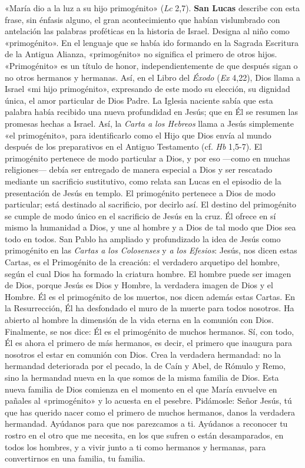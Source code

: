 \documentclass[]{article}
\begin{document}
«María dio a la luz a su hijo primogénito» (\emph{Lc} 2,7). \textbf{San
Lucas} describe con esta frase, sin énfasis alguno, el gran
acontecimiento que habían vislumbrado con antelación las palabras
proféticas en la historia de Israel. Designa al niño como «primogénito».
En el lenguaje que se había ido formando en la Sagrada Escritura de la
Antigua Alianza, «primogénito» no significa el primero de otros hijos.
«Primogénito» es un título de honor, independientemente de que después
sigan o no otros hermanos y hermanas. Así, en el Libro del \emph{Éxodo}
(\emph{Ex} 4,22), Dios llama a Israel «mi hijo primogénito», expresando
de este modo su elección, su dignidad única, el amor particular de Dios
Padre. La Iglesia naciente sabía que esta palabra había recibido una
nueva profundidad en Jesús; que en Él se resumen las promesas hechas a
Israel. Así, la \emph{Carta a los Hebreos} llama a Jesús simplemente «el
primogénito», para identificarlo como el Hijo que Dios envía al mundo
después de los preparativos en el Antiguo Testamento (cf. \emph{Hb}
1,5-7). El primogénito pertenece de modo particular a Dios, y por eso
---como en muchas religiones--- debía ser entregado de manera especial a
Dios y ser rescatado mediante un sacrificio sustitutivo, como relata san
Lucas en el episodio de la presentación de Jesús en templo. El
primogénito pertenece a Dios de modo particular; está destinado al
sacrificio, por decirlo así. El destino del primogénito se cumple de
modo único en el sacrificio de Jesús en la cruz. Él ofrece en sí mismo
la humanidad a Dios, y une al hombre y a Dios de tal modo que Dios sea
todo en todos. San Pablo ha ampliado y profundizado la idea de Jesús
como primogénito en las \emph{Cartas a los Colosenses} y \emph{a los
Efesios}: Jesús, nos dicen estas Cartas, es el Primogénito de la
creación: el verdadero arquetipo del hombre, según el cual Dios ha
formado la criatura hombre. El hombre puede ser imagen de Dios, porque
Jesús es Dios y Hombre, la verdadera imagen de Dios y el Hombre. Él es
el primogénito de los muertos, nos dicen además estas Cartas. En la
Resurrección, Él ha desfondado el muro de la muerte para todos nosotros.
Ha abierto al hombre la dimensión de la vida eterna en la comunión con
Dios. Finalmente, se nos dice: Él es el primogénito de muchos hermanos.
Sí, con todo, Él es ahora el primero de más hermanos, es decir, el
primero que inaugura para nosotros el estar en comunión con Dios. Crea
la verdadera hermandad: no la hermandad deteriorada por el pecado, la de
Caín y Abel, de Rómulo y Remo, sino la hermandad nueva en la que somos
de la misma familia de Dios. Esta nueva familia de Dios comienza en el
momento en el que María envuelve en pañales al «primogénito» y lo
acuesta en el pesebre. Pidámosle: Señor Jesús, tú que has querido nacer
como el primero de muchos hermanos, danos la verdadera hermandad.
Ayúdanos para que nos parezcamos a ti. Ayúdanos a reconocer tu rostro en
el otro que me necesita, en los que sufren o están desamparados, en
todos los hombres, y a vivir junto a ti como hermanos y hermanas, para
convertirnos en una familia, tu familia.
\end{document}
